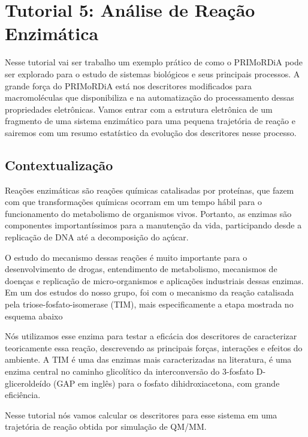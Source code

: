 \documentclass[a4paper,11pt]{refart}
\begin{document}
\newpage
\section{Tutorial 5: Análise de Reação Enzimática}

Nesse tutorial vai ser trabalho um exemplo prático de como o PRIMoRDiA pode ser explorado para o estudo de sistemas biológicos e seus principais processos. A grande força do PRIMoRDiA está nos descritores modificados para macromoléculas que disponibiliza e na automatização do processamento dessas propriedades eletrônicas. Vamos entrar com a estrutura eletrônica de um fragmento de uma sistema enzimático para uma pequena trajetória de reação e sairemos com um resumo estatístico da evolução dos descritores nesse processo.


\subsection{Contextualização}

Reações enzimáticas são reações químicas catalisadas por proteínas, que fazem com que transformações químicas ocorram em um tempo hábil para o funcionamento do metabolismo de organismos vivos. Portanto, as enzimas são componentes importantíssimos para a manutenção da vida, participando desde a replicação de DNA até a decomposição do açúcar.

O estudo do mecanismo dessas reações é muito importante para o desenvolvimento de drogas, entendimento de metabolismo, mecanismos de doenças e replicação de micro-organismos e aplicações industriais dessas enzimas. Em um dos estudos do nosso grupo, foi com o mecanismo da reação catalisada pela triose-fosfato-isomerase (TIM), mais especificamente a etapa mostrada no esquema abaixo

Nós utilizamos esse enzima para testar a eficácia dos descritores de caracterizar teoricamente essa reação, descrevendo as principais forças, interações e efeitos do ambiente. A TIM é uma das enzimas mais caracterizadas na literatura, é uma enzima central no caminho glicolítico da interconversão do 3-fosfato D-gliceroldeído (GAP em inglês) para o fosfato dihidroxiacetona, com grande eficiência.

Nesse tutorial nós vamos calcular os descritores para esse sistema em uma trajetória de reação obtida por simulação de QM/MM.
\end{document}
